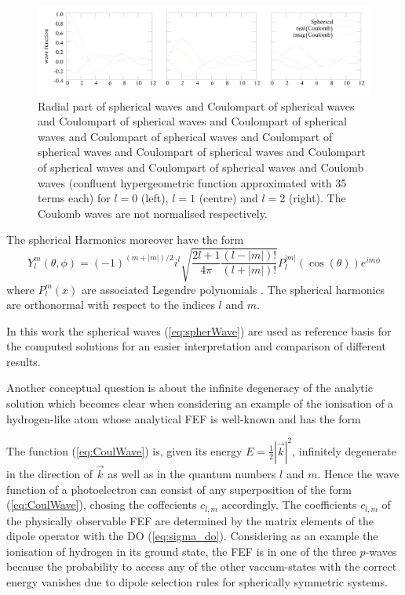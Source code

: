 \begin{figure}
\includegraphics[width=\textwidth]{Figures/RBF/RadialPart}
\caption{Radial part of spherical waves and Coulompart of spherical waves and Coulompart of spherical waves and Coulompart of spherical waves and Coulompart of spherical waves and Coulompart of spherical waves and Coulompart of spherical waves and Coulompart of spherical waves and Coulompart of spherical waves and Coulomb waves (confluent hypergeometric function approximated with 35 terms each) for $l=0$ (left), $l=1$ (centre) and $l=2$ (right).
The Coulomb waves are not normalised respectively.}
\label{fig:RadFun}
\end{figure}
The spherical Harmonics moreover have the form
\begin{equation}\label{eq:SphHarm}
Y_l^m(\theta,\phi)= (-1)^{(m+|m|)/2} i^l \sqrt{\frac{2l+1}{4\pi}\frac{(l-|m|)!}{(l+|m|)!}}  P_l^{|m|}(\cos(\theta)) e^{im\phi}
\end{equation}
where $P_l^m(x)$ are associated Legendre polynomials \cite{Lifschitz}.
The spherical harmonics are orthonormal with respect to the indices $l$ and $m$.

In this work the spherical waves (\ref{eq:spherWave}) are used as reference basis for the computed solutions for an easier interpretation and comparison of different results.

Another conceptual question is about the infinite degeneracy of the analytic solution which becomes clear when considering an example of the ionisation of a hydrogen-like atom whose analytical FEF is well-known and has the form \cite{Lifschitz}
%

The function (\ref{eq:CoulWave}) is, given its energy $E=\frac 12 |\vec{k}|^2$, infinitely degenerate in the direction of $\vec{k}$ as well as in the quantum numbers $l$ and $m$.
Hence the wave function of a photoelectron can consist of any superposition of the form (\ref{eq:CoulWave}), chosing the coffecients $c_{l,m}$ accordingly.
The coefficients $c_{l,m}$ of the physically observable FEF are determined by the matrix elements of the dipole operator with the DO (\ref{eq:sigma_do}).  
Considering as an example the ionisation of hydrogen in its ground state, the FEF is in one of the three $p$-waves because the probability to access any of the other vaccum-states with the correct energy vanishes due to dipole selection rules for spherically symmetric systems.

